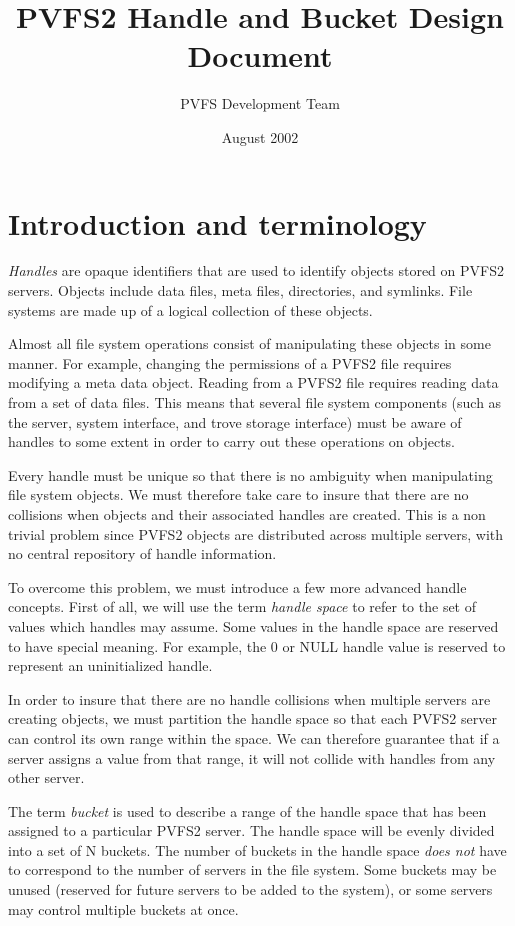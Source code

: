 \documentclass[12pt]{article} %
\title{PVFS2 Handle and Bucket Design Document}
\author{PVFS Development Team}
\date{August 2002}
\begin{document}
\maketitle

\tableofcontents

\newpage

\section{Introduction and terminology}

\emph{Handles} are opaque identifiers that are used to identify objects stored
on PVFS2 servers.  Objects include data files, meta files, directories,
and symlinks.  File systems are made up of a logical collection of these
objects.

Almost all file system operations consist of manipulating these objects
in some manner.  For example, changing the permissions of a PVFS2
file requires modifying a meta data object.  Reading from a PVFS2 file
requires reading data from a set of data files.  This means that several
file system components (such as the server, system interface, and
trove storage interface) must be aware of handles to some extent in
order to carry out these operations on objects.

Every handle must be unique so that there is no ambiguity when
manipulating file system objects.  We must therefore take care to insure
that there are no collisions when objects and their associated handles
are created.  This is a non trivial problem since PVFS2 objects are
distributed across multiple servers, with no central repository of
handle information.

To overcome this problem, we must introduce a few more advanced handle 
concepts.  First of all, we will use the term \emph{handle space} to
refer to the set of values which handles may assume.  Some values
in the handle space are reserved to have special meaning.  For example,
the 0 or NULL handle value is reserved to represent an uninitialized
handle.

In order to insure that there are no handle collisions when multiple
servers are creating objects, we must partition the handle space so 
that each PVFS2 server can control its own range within the space.
We can therefore guarantee that if a server assigns a value from that range,
it will not collide with handles from any other server.

The term \emph{bucket} is used to describe a range of the handle space
that has been assigned to a particular PVFS2 server.  The handle space
will be evenly divided into a set of N buckets.  The number of buckets
in the handle space \emph{does not} have to correspond to the number of
servers in the file system.  Some buckets may be unused (reserved for
future servers to be added to the system), or some servers may control
multiple buckets at once.
\end{document}
